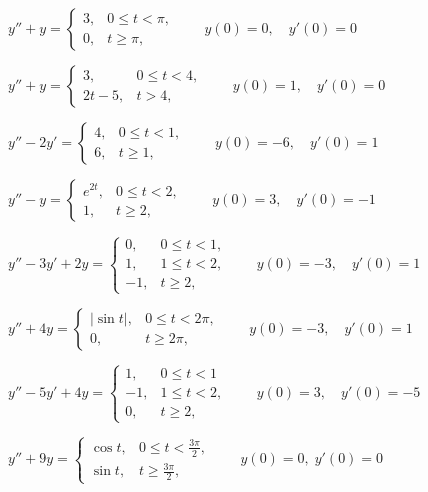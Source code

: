 \begin{exerciselist}

\item\label{exer:8.5.1}$y''+y=\begin{cases}
3,& 0\le t<\pi,\\
0,&t\ge\pi,\end{cases}\qquad y(0)=0, \quad  y'(0)=0$

\item\label{exer:8.5.2}$y''+y=\begin{cases}
3,&0\le t<4,\\
2t-5,&t > 4,\end{cases}\qquad y(0)=1,\quad y'(0)=0$

\item\label{exer:8.5.3}$y''-2y'=\begin{cases}
4,&0\le t<1,\\
6,&t\ge 1,\end{cases}\qquad y(0)=-6,\quad y'(0)=1$

\item\label{exer:8.5.4}$y''-y=\begin{cases}
e^{2t},&0\le t< 2,\\
1,&t\ge 2,\end{cases}\qquad y(0)=3,\quad y'(0)=-1$

\item\label{exer:8.5.5}$y''-3y'+2y= \begin{cases}
0,&0\le t<1,\\
1,&1\le t<2,\\
-1,&t\ge 2,
\end{cases}\qquad y(0)=-3,\quad y'(0)=1$

\item\label{exer:8.5.6}\CGex $y''+4y=\begin{cases}
|\sin t|,&0\le t<2\pi,\\
0,&t\ge 2\pi,
\end{cases}\qquad y(0)=-3,\quad y'(0)=1$

\item\label{exer:8.5.7}$y''-5y'+4y=\begin{cases}
1,&0\le t<1\\
-1,&1\le t<2,\\
0,&t\ge 2,
\end{cases}\qquad y(0)=3,\quad y'(0)=-5$

\item\label{exer:8.5.8}$y''+9y=\begin{cases}
\cos t,&0\le t<\frac{3\pi}{2},\\
\sin t,&t\ge\frac{3\pi}{2},
\end{cases}\qquad y(0)=0,\;  y'(0)=0$


\end{exerciselist}
